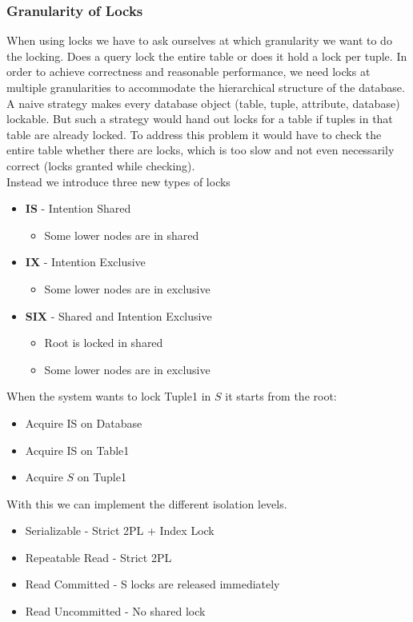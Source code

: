 \subsubsection{Granularity of Locks}
When using locks we have to ask ourselves at which granularity we want to do the locking. Does a query lock the entire table or does it hold a lock per tuple. In order to achieve correctness and reasonable performance, we need locks at multiple granularities to accommodate the hierarchical structure of the database. A naive strategy makes every database object (table, tuple, attribute, database) lockable. But such a strategy would hand out locks for a table if tuples in that table are already locked. To address this problem it would have to check the entire table whether there are locks, which is too slow and not even necessarily correct (locks granted while checking).\\
Instead we introduce three new types of locks \begin{itemize}
\item \textbf{IS} - Intention Shared
\begin{itemize}
\item Some lower nodes are in shared
\end{itemize}
\item \textbf{IX} - Intention Exclusive
\begin{itemize}
\item Some lower nodes are in exclusive
\end{itemize}
\item \textbf{SIX} - Shared and Intention Exclusive
\begin{itemize}
\item Root is locked in shared
\item Some lower nodes are in exclusive
\end{itemize}
\end{itemize}
When the system wants to lock Tuple1 in $S$ it starts from the root:
\begin{itemize}
\item Acquire IS on Database
\item Acquire IS on Table1
\item Acquire $S$ on Tuple1
\end{itemize}
With this we can implement the different isolation levels.
\begin{itemize}
\item Serializable - Strict 2PL + Index Lock
\item Repeatable Read - Strict 2PL
\item Read Committed - S locks are released immediately
\item Read Uncommitted - No shared lock
\end{itemize}

